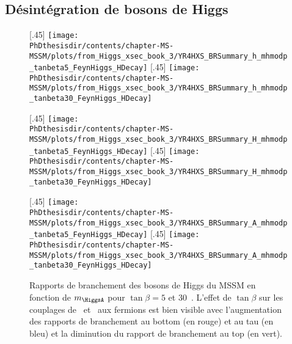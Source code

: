 \subsection{Désintégration de bosons de Higgs}\label{chapter-MS-MSSM-section-pheno_Higgs_MSSM-subsec-desintegration_Higgs}
\begin{figure}[p]
\centering
{}[.45\textwidth]
{\texttt{[image: \\PhDthesisdir/contents/chapter-MS-MSSM/plots/from\_Higgs\_xsec\_book\_3/YR4HXS\_BRSummary\_h\_mhmodp\_tanbeta5\_FeynHiggs\_HDecay]}\vspace{-.5\baselineskip}}
\hfill
{}[.45\textwidth]
{\texttt{[image: \\PhDthesisdir/contents/chapter-MS-MSSM/plots/from\_Higgs\_xsec\_book\_3/YR4HXS\_BRSummary\_h\_mhmodp\_tanbeta30\_FeynHiggs\_HDecay]}\vspace{-.5\baselineskip}}

\vspace{.75\baselineskip}
[.45\textwidth]
{\texttt{[image: \\PhDthesisdir/contents/chapter-MS-MSSM/plots/from\_Higgs\_xsec\_book\_3/YR4HXS\_BRSummary\_H\_mhmodp\_tanbeta5\_FeynHiggs\_HDecay]}\vspace{-.5\baselineskip}}
\hfill
{}[.45\textwidth]
{\texttt{[image: \\PhDthesisdir/contents/chapter-MS-MSSM/plots/from\_Higgs\_xsec\_book\_3/YR4HXS\_BRSummary\_H\_mhmodp\_tanbeta30\_FeynHiggs\_HDecay]}\vspace{-.5\baselineskip}}

\vspace{.75\baselineskip}
[.45\textwidth]
{\texttt{[image: \\PhDthesisdir/contents/chapter-MS-MSSM/plots/from\_Higgs\_xsec\_book\_3/YR4HXS\_BRSummary\_A\_mhmodp\_tanbeta5\_FeynHiggs\_HDecay]}\vspace{-.5\baselineskip}}
\hfill
{}[.45\textwidth]
{\texttt{[image: \\PhDthesisdir/contents/chapter-MS-MSSM/plots/from\_Higgs\_xsec\_book\_3/YR4HXS\_BRSummary\_A\_mhmodp\_tanbeta30\_FeynHiggs\_HDecay]}\vspace{-.5\baselineskip}}

\caption[Rapports de branchement des bosons de Higgs du MSSM.]{Rapports de branchement des bosons de Higgs du MSSM en fonction de $m_{\HiggsA}$ pour $\tan\beta=5$ et $30$~\cite{Higgs_xsec_book_2,Higgs_xsec_book_3}. L'effet de $\tan\beta$ sur les couplages de \Higgs\ et \HiggsA\ aux fermions est bien visible avec l'augmentation des rapports de branchement au bottom (en rouge) et au tau (en bleu) et la diminution du rapport de branchement au top (en vert).}
\label{fig-BR_hHA_tanbeta_5_30}
\end{figure}
